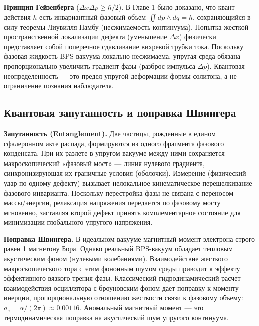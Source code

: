\documentclass[11pt,a4paper]{article}
\begin{document}
\textbf{Принцип Гейзенберга} ($\Delta x \Delta p \ge \hbar/2$). В Главе 1 было доказано, что квант действия $h$ есть инвариантный фазовый объем $\iint dp \wedge dq = h$, сохраняющийся в силу теоремы Лиувилля-Намбу (несжимаемость континуума). Попытка жесткой пространственной локализации дефекта (уменьшение $\Delta x$) физически представляет собой поперечное сдавливание вихревой трубки тока. Поскольку фазовая жидкость BPS-вакуума локально несжимаема, упругая среда обязана пропорционально увеличить градиент фазы (разброс импульса $\Delta p$). Квантовая неопределенность — это предел упругой деформации формы солитона, а не ограничение познания наблюдателя.

\subsection{Квантовая запутанность и поправка Швингера}
\textbf{Запутанность (Entanglement).} Две частицы, рожденные в едином сфалеронном акте распада, формируются из одного фрагмента фазового конденсата. При их разлете в упругом вакууме между ними сохраняется макроскопический «фазовый мост» — линия нулевого градиента, синхронизирующая их граничные условия (оболочки). Измерение (физический удар по одному дефекту) вызывает нелокальное кинематическое перещелкивание фазового инварианта. Поскольку перестройка фазы не связана с переносом массы/энергии, релаксация напряжения передается по фазовому мосту мгновенно, заставляя второй дефект принять комплементарное состояние для минимизации глобального упругого напряжения.

\textbf{Поправка Швингера.} В идеальном вакууме магнитный момент электрона строго равен 1 магнетону Бора. Однако реальный BPS-вакуум обладает тепловым акустическим фоном (нулевыми колебаниями). Взаимодействие жесткого макроскопического тора с этим фононным шумом среды приводит к эффекту эффективного вязкого трения фазы. Классический гидродинамический расчет взаимодействия осциллятора с броуновским фоном дает поправку к моменту инерции, пропорциональную отношению жесткости связи к фазовому объему: $a_e = \alpha / (2\pi) \approx 0.00116$. Аномальный магнитный момент — это термодинамическая поправка на акустический шум упругого континуума.
\end{document}
